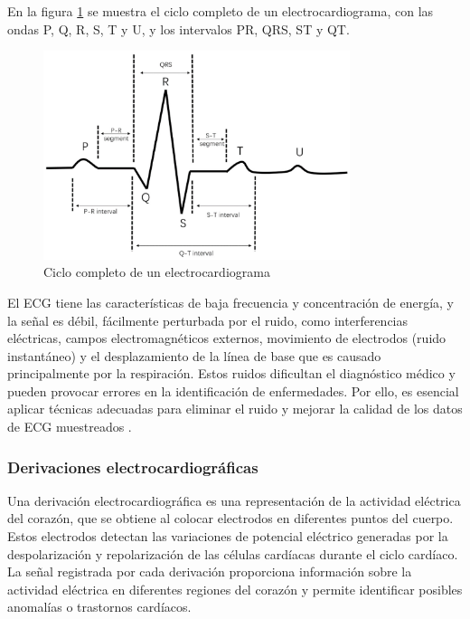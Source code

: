     En la figura \ref{fig:ECG_ondas} se muestra el ciclo completo de un electrocardiograma, con las ondas P, Q, R, S, T y U, y los intervalos PR, QRS, ST y QT.

    \begin{figure}[H]
        \centering
        \includegraphics[width=0.8\textwidth]{img/Marco/ECG_ondas.png}
        \caption[Ciclo completo de un electrocardiograma]{Ciclo completo de un electrocardiograma\footnotemark}
        \label{fig:ECG_ondas}
    \end{figure}

    El ECG tiene las características de baja frecuencia y concentración de energía, y la señal es débil, fácilmente perturbada por el ruido, como interferencias eléctricas, campos electromagnéticos externos, movimiento de electrodos (ruido instantáneo)  y el desplazamiento de la línea de base que es causado principalmente por la respiración. Estos ruidos dificultan el diagnóstico médico y pueden provocar errores en la identificación de enfermedades. Por ello, es esencial aplicar técnicas adecuadas para eliminar el ruido y mejorar la calidad de los datos de ECG muestreados \cite{AlMahamdy_2014}.

        \subsubsection{Derivaciones electrocardiográficas}
        Una derivación electrocardiográfica es una representación de la actividad eléctrica del corazón, que se obtiene al colocar electrodos en diferentes puntos del cuerpo. Estos electrodos detectan las variaciones de potencial eléctrico generadas por la despolarización y repolarización de las células cardíacas durante el ciclo cardíaco. La señal registrada por cada derivación proporciona información sobre la actividad eléctrica en diferentes regiones del corazón y permite identificar posibles anomalías o trastornos cardíacos.

